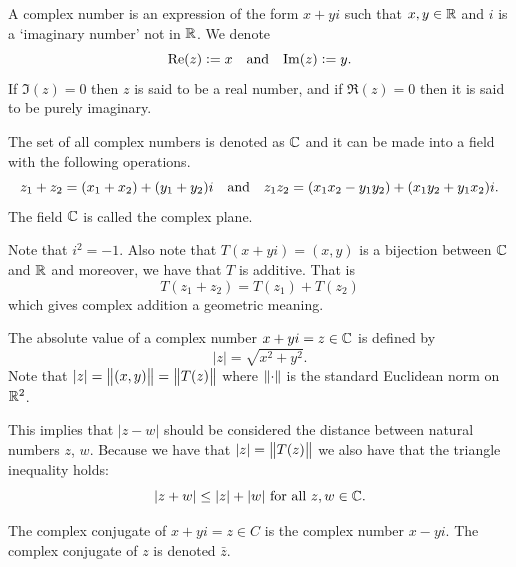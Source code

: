 \documentclass[11pt,a4paper]{article}
\begin{document}
\begin{definition}
  A complex number is an expression of the form $x + yi$ such that
  $x,y \in \mathbb{R}$ and $i$ is a `imaginary number' not in $\mathbb{R}$.
  We denote
  \[
      \mathrm{Re}(z) := x \quad \text{and} \quad \mathrm{Im}(z) := y.
  \]
  If $\Im(z) = 0$ then $z$ is said to be a real number, and if
  $\Re(z) = 0$ then it is said to be purely imaginary.
\end{definition}
\begin{remark}
The set of all complex numbers is denoted as $\mathbb{C}$ and it can be made into
a field with the following operations.
\[
  z_1 + z_2 = (x_1 + x_2) + (y_1 + y_2) i \quad \text{and} \quad
  z_1 z_2 = (x_1 x_2 - y_1 y_2) + (x_1 y_2 + y_1 x_2) i.
\]
The field $\mathbb{C}$ is called the complex plane.

Note that $i^2 = -1$.
Also note that $T(x + y i) = (x, y)$ is a bijection between $\mathbb{C}$ and $\mathbb{R}$ and
moreover, we have that $T$ is additive.
That is
\[
  T(z_1 + z_2) = T(z_1) + T(z_2)
\]
which gives complex addition a geometric meaning.

\begin{center}
\end{center}

The absolute value of a complex number $x + y i = z \in \mathbb{C}$ is defined by
\[
  |z| = \sqrt{x^2 + y^2}.
\]
Note that $|z| = \left\lVert(x,y)\right\rVert= \left\lVert T(z)\right\rVert$ where $\left\lVert\cdot\right\rVert$ is the standard
Euclidean norm on $\mathbb{R}^2$.

This implies that $|z - w|$ should be considered the distance between natural
numbers $z$, $w$.
Because we have that $|z| = \left\lVert T(z)\right\rVert$ we also have that the triangle
inequality holds:
\[
  |z + w| \le |z| + |w| \text{ for all } z,w \in \mathbb{C}.
\]
\end{remark}
\begin{definition}
  The complex conjugate of $x + y i = z \in C$ is the complex number
  $x - y i$. The complex conjugate of $z$ is denoted $\bar{z}$.
\end{definition}

\begin{center}
\end{center}
\end{document}
